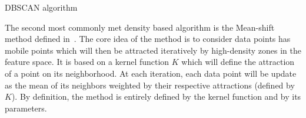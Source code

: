 \documentclass[a4paper]{report}
\begin{document}
\begin{algorithm}
    \caption{DBSCAN algorithm}
\label{alg:dbscan}

    \end{algorithm}

    The second most commonly met density based algorithm is the Mean-shift method defined in~\cite{cheng1995mean}. The core idea of the method is to consider data points has mobile points which will then be attracted iteratively by high-density zones in the feature space. It is based on a kernel function $K$ which will define the attraction of a point on its neighborhood. At each iteration, each data point will be update as the mean of its neighbors weighted by their respective attractions (defined by $K$). By definition, the method is entirely defined by the kernel function and by its parameters.
\end{document}
